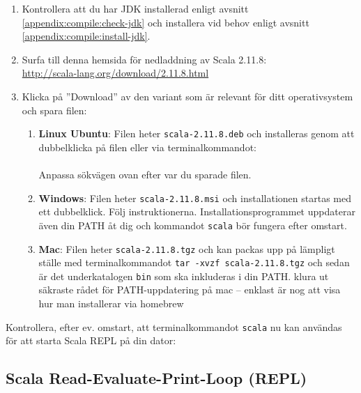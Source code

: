 \begin{enumerate}
\item Kontrollera att du har JDK installerad enligt avsnitt \ref{appendix:compile:check-jdk} och installera vid behov enligt avsnitt \ref{appendix:compile:install-jdk}.
\item Surfa till denna hemsida för nedladdning av Scala 2.11.8: \\ \url{http://scala-lang.org/download/2.11.8.html}
\item Klicka på ''Download'' av den variant som är relevant för ditt operativsystem och spara filen:

\begin{enumerate}
\item \textbf{Linux Ubuntu}: Filen heter \texttt{scala-2.11.8.deb} och installeras genom att dubbelklicka på filen eller via terminalkommandot:\\  \\ Anpassa sökvägen ovan efter var du sparade filen. 
\item \textbf{Windows}: Filen heter \texttt{scala-2.11.8.msi} och installationen startas med ett dubbelklick. Följ instruktionerna. Installationsprogrammet uppdaterar även din PATH åt dig och kommandot \texttt{scala} bör fungera efter omstart.
\item \textbf{Mac}: Filen heter \texttt{scala-2.11.8.tgz} och kan packas upp på lämpligt ställe med terminalkommandot \texttt{tar -xvzf scala-2.11.8.tgz} och sedan är det underkatalogen \texttt{bin} som ska inkluderas i din PATH. \TODO klura ut säkraste rådet för PATH-uppdatering på mac -- enklast är nog att visa hur man installerar via homebrew
\end{enumerate}
\end{enumerate}
Kontrollera, efter ev. omstart, att terminalkommandot \texttt{scala} nu kan användas för att starta Scala REPL på din dator:
 

\subsection{Scala Read-Evaluate-Print-Loop (REPL)}\label{appendix:compile:REPL}


